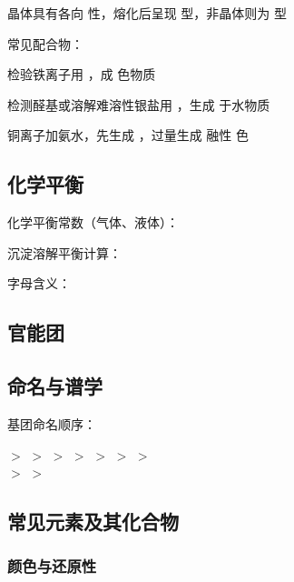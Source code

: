 晶体具有各向 \sbl 性，熔化后呈现 \sbl 型，非晶体则为 \sbl 型

常见配合物：

检验铁离子用 \sbl ，成 \sbl 色物质\mbl

检测醛基或溶解难溶性银盐用 \sbl ，生成 \sbl 于水物质\mbl

铜离子加氨水，先生成 \sbl ，过量生成 \sbl 融性 \sbl 色 \sbl

\subsection{化学平衡}
化学平衡常数（气体、液体）：\lbl

沉淀溶解平衡计算：\lbl

字母含义：


\subsection{官能团}
\subsection{命名与谱学}
基团命名顺序：

\sbl $>$ \sbl $>$ \sbl $>$ \sbl $>$ \sbl $>$ \sbl $>$ \sbl $>$ \sbl \\
\sbl $>$ \sbl $>$ \sbl


\subsection{常见元素及其化合物}

\subsubsection{颜色与还原性}


